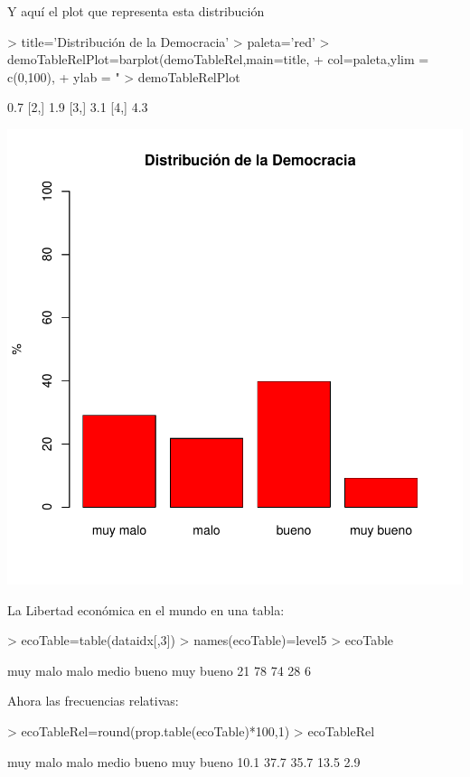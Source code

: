 \documentclass{article}
\begin{document}
Y aquí el plot que representa esta distribución
\begin{Schunk}
\begin{Sinput}
> title='Distribución de la Democracia'
> paleta='red'
> demoTableRelPlot=barplot(demoTableRel,main=title,
+                          col=paleta,ylim = c(0,100),
+                          ylab = "%
> demoTableRelPlot
\end{Sinput}
\begin{Soutput}
     [,1]
[1,]  0.7
[2,]  1.9
[3,]  3.1
[4,]  4.3
\end{Soutput}
\end{Schunk}
\includegraphics{version_0-demoTableRelPlot}


La Libertad económica en el mundo en una tabla:
\begin{Schunk}
\begin{Sinput}
> ecoTable=table(dataidx[,3])
> names(ecoTable)=level5
> ecoTable
\end{Sinput}
\begin{Soutput}
 muy malo      malo     medio     bueno muy bueno 
       21        78        74        28         6 
\end{Soutput}
\end{Schunk}


Ahora las frecuencias relativas:
\begin{Schunk}
\begin{Sinput}
> ecoTableRel=round(prop.table(ecoTable)*100,1)
> ecoTableRel
\end{Sinput}
\begin{Soutput}
 muy malo      malo     medio     bueno muy bueno 
     10.1      37.7      35.7      13.5       2.9 
\end{Soutput}
\end{Schunk}
\end{document}
